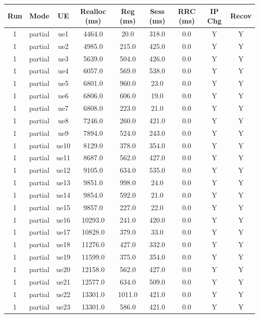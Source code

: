 \begin{table}[ht]
\centering
\begin{tabular}{|c|c|c|c|c|c|c|c|c|}
\hline
Run & Mode & UE & Realloc (ms) & Reg (ms) & Sess (ms) & RRC (ms) & IP Chg & Recov \\
\hline
1 & partial & ue1 & 4464.0 & 20.0 & 318.0 & 0.0 & Y & Y \\
1 & partial & ue2 & 4985.0 & 215.0 & 425.0 & 0.0 & Y & Y \\
1 & partial & ue3 & 5639.0 & 504.0 & 426.0 & 0.0 & Y & Y \\
1 & partial & ue4 & 6057.0 & 569.0 & 538.0 & 0.0 & Y & Y \\
1 & partial & ue5 & 6801.0 & 960.0 & 23.0 & 0.0 & Y & Y \\
1 & partial & ue6 & 6806.0 & 606.0 & 19.0 & 0.0 & Y & Y \\
1 & partial & ue7 & 6808.0 & 223.0 & 21.0 & 0.0 & Y & Y \\
1 & partial & ue8 & 7246.0 & 260.0 & 421.0 & 0.0 & Y & Y \\
1 & partial & ue9 & 7894.0 & 524.0 & 243.0 & 0.0 & Y & Y \\
1 & partial & ue10 & 8129.0 & 378.0 & 354.0 & 0.0 & Y & Y \\
1 & partial & ue11 & 8687.0 & 562.0 & 427.0 & 0.0 & Y & Y \\
1 & partial & ue12 & 9105.0 & 634.0 & 535.0 & 0.0 & Y & Y \\
1 & partial & ue13 & 9851.0 & 998.0 & 24.0 & 0.0 & Y & Y \\
1 & partial & ue14 & 9854.0 & 592.0 & 21.0 & 0.0 & Y & Y \\
1 & partial & ue15 & 9857.0 & 227.0 & 22.0 & 0.0 & Y & Y \\
1 & partial & ue16 & 10293.0 & 241.0 & 420.0 & 0.0 & Y & Y \\
1 & partial & ue17 & 10828.0 & 379.0 & 33.0 & 0.0 & Y & Y \\
1 & partial & ue18 & 11276.0 & 427.0 & 332.0 & 0.0 & Y & Y \\
1 & partial & ue19 & 11599.0 & 375.0 & 354.0 & 0.0 & Y & Y \\
1 & partial & ue20 & 12158.0 & 562.0 & 427.0 & 0.0 & Y & Y \\
1 & partial & ue21 & 12577.0 & 634.0 & 509.0 & 0.0 & Y & Y \\
1 & partial & ue22 & 13301.0 & 1011.0 & 421.0 & 0.0 & Y & Y \\
1 & partial & ue23 & 13301.0 & 586.0 & 421.0 & 0.0 & Y & Y \\

\end{tabular}
\end{table}

